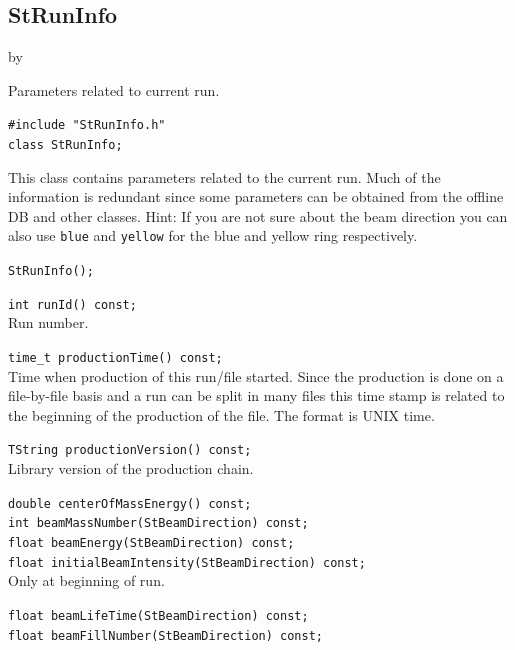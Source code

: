 \documentclass[twoside]{article}
\newcommand{\entrylabel}[1]{\mbox{\textbf{{#1}}}\hfil}%
\newenvironment{entry}
{\begin{list}{}%
    {\renewcommand{\makelabel}{\entrylabel}%
     \setlength{\labelwidth}{90pt}%
     \setlength{\leftmargin}{\labelwidth}
     \advance\leftmargin by \labelsep%
      }%
    }%
  {\end{list}}
\newcommand{\Entrylabel}[1]%
{\raisebox{0pt}[1ex][0pt]{\makebox[\labelwidth][l]%
    {\parbox[t]{\labelwidth}{\hspace{0pt}\textbf{{#1}}}}}}
\newenvironment{Entry}%
{\renewcommand{\entrylabel}{\Entrylabel}\begin{entry}}%
  {\end{entry}}
\begin{document}
\subsection{StRunInfo}
\label{sec:StRunInfo}
\begin{Entry}
\item[Summary]
    Parameters related to current run.
\item[Synopsis]
    \verb+#include "StRunInfo.h"+\\
    \verb+class StRunInfo;+\\
\item[Description]
    This class contains parameters related to the current run.
    Much of the information is redundant since some parameters
    can be obtained from the offline DB and other classes.
    Hint: If you are not sure about the beam direction you can also
    use \texttt{blue} and \texttt{yellow} for the blue and yellow
    ring respectively.
\item[Public\\ Constructors]
    \verb+StRunInfo();+\\
    
\item[Public Member\\ Functions]
    \verb+int runId() const;+\\
    Run number.
    
    \verb+time_t productionTime() const;+\\
    Time when production of this run/file started. Since the
    production is done on a file-by-file basis and a run can be split
    in many files this time stamp is related to the beginning of the
    production of the file. The format is UNIX time.
    
    \verb+TString productionVersion() const;+\\
    Library version of the production chain.
    
    \verb+double centerOfMassEnergy() const;+\\
    \verb+int beamMassNumber(StBeamDirection) const;+\\
    \verb+float beamEnergy(StBeamDirection) const;+\\
    \verb+float initialBeamIntensity(StBeamDirection) const;+\\
    Only at beginning of run.
    
    \verb+float beamLifeTime(StBeamDirection) const;+\\
    \verb+float beamFillNumber(StBeamDirection) const;+\\


\end{Entry}
\end{document}
